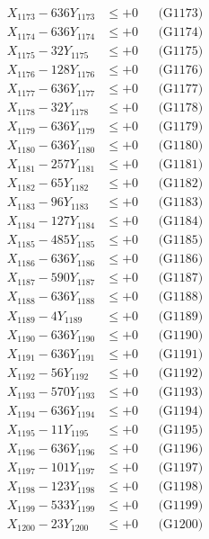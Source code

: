 \documentclass[a4paper,10pt]{article}
\begin{document}
{\begin{align}
X_{1173} - 636Y_{1173} &\leq +0 && \text{(G1173)} \\
X_{1174} - 636Y_{1174} &\leq +0 && \text{(G1174)} \\
X_{1175} - 32Y_{1175} &\leq +0 && \text{(G1175)} \\
X_{1176} - 128Y_{1176} &\leq +0 && \text{(G1176)} \\
X_{1177} - 636Y_{1177} &\leq +0 && \text{(G1177)} \\
X_{1178} - 32Y_{1178} &\leq +0 && \text{(G1178)} \\
X_{1179} - 636Y_{1179} &\leq +0 && \text{(G1179)} \\
X_{1180} - 636Y_{1180} &\leq +0 && \text{(G1180)} \\
\allowbreak
X_{1181} - 257Y_{1181} &\leq +0 && \text{(G1181)} \\
X_{1182} - 65Y_{1182} &\leq +0 && \text{(G1182)} \\
X_{1183} - 96Y_{1183} &\leq +0 && \text{(G1183)} \\
X_{1184} - 127Y_{1184} &\leq +0 && \text{(G1184)} \\
X_{1185} - 485Y_{1185} &\leq +0 && \text{(G1185)} \\
X_{1186} - 636Y_{1186} &\leq +0 && \text{(G1186)} \\
X_{1187} - 590Y_{1187} &\leq +0 && \text{(G1187)} \\
X_{1188} - 636Y_{1188} &\leq +0 && \text{(G1188)} \\
X_{1189} - 4Y_{1189} &\leq +0 && \text{(G1189)} \\
X_{1190} - 636Y_{1190} &\leq +0 && \text{(G1190)} \\
\allowbreak
X_{1191} - 636Y_{1191} &\leq +0 && \text{(G1191)} \\
X_{1192} - 56Y_{1192} &\leq +0 && \text{(G1192)} \\
X_{1193} - 570Y_{1193} &\leq +0 && \text{(G1193)} \\
X_{1194} - 636Y_{1194} &\leq +0 && \text{(G1194)} \\
X_{1195} - 11Y_{1195} &\leq +0 && \text{(G1195)} \\
X_{1196} - 636Y_{1196} &\leq +0 && \text{(G1196)} \\
X_{1197} - 101Y_{1197} &\leq +0 && \text{(G1197)} \\
X_{1198} - 123Y_{1198} &\leq +0 && \text{(G1198)} \\
X_{1199} - 533Y_{1199} &\leq +0 && \text{(G1199)} \\
X_{1200} - 23Y_{1200} &\leq +0 && \text{(G1200)} \\

\end{align}}
\end{document}
